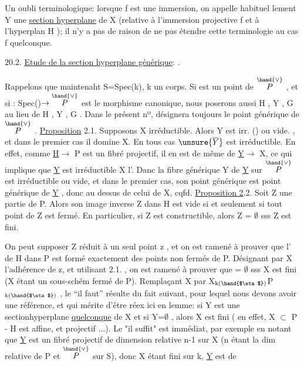 
\placedmargin{$|$}Un oubli terminologique: lorsque f est une immersion, on appelle habituel%
lement Y\hand{$_\zeta$} une \uline{section hyperplane} de X (relative à l'immersion projective
f et à l'hyperplan H  ); il n'y a pas de raison de ne pas étendre cette
terminologie au cas f quelconque.

20.2. \uline{Etude de la section hyperplane générique}:  .

Rappelons que maintenaht S=Spec(k), k un corps. Si \hand{$\eta$} est un point
de $\overset{\hand{\vee}}{P}$ ,  et si \hand{$\zeta$}: Spec(\hand{$\eta$})$\to\overset{\hand{\vee}}{P}$ est le morphisme canonique, nous poserons
aussi H\hand{$_\eta$} , Y\hand{$_\eta$} , G\hand{$_\eta$} au lieu de H\hand{$_\zeta$} , Y\hand{$_\zeta$} , G\hand{$_\zeta$} . Dans le présent nº, \hand{$\eta$}
désignera toujours le point générique de $\overset{\hand{\vee}}{P}$ .
\uline{Proposition} 2.1. Supposons X irréductible. Alors Y\hand{$_\eta$} est irr. () ou vide. ,
et dans le premier cas il domine X. En tous cas $\unsure{\overline{Y}}$ est \unsure{$_\eta$} irréductible.
En effet, comme \uline{H}$\longrightarrow$ P est un fibré projectif, il en est de même de
\uline{Y}$\longrightarrow$ X, ce qui implique que \uline{Y} est irréductible X l'. Danc la fibre
générique Y   de \uline{Y} sur $\overset{\hand{\vee}}{P}$ est irréductible ou vide, et dans le premier cas,
son point générique est point générique de \uline{Y} , donc au dessus de celui de
X, cqfd.
\uline{Proposition 2}.2. Soit Z une partie de P. Alors son image inverse Z\hand{$_\eta$} dans
H\hand{$_\eta$} est vide si et seulement si tout point de Z est fermé. En particulier,
si Z est constructible, alors Z\hand{$_\eta$} = $\emptyset$ sss Z est fini.

On peut supposer Z réduit à un seul point z , et on est ramené à
prouver que l' de H dans P est formé exactement des points non fermés de P.
Désignant par X l'adhérence de z, et utilisant 2.1. , on est ramené à
prouver que \hand{$_\eta$} = $\emptyset$ sss X est  fini (X étant un sous-schém%
fermé  de P). Remplaçant X par X$_{\text{k(\hand{$\eta$})}}$\hand{$\hookrightarrow$}P$_{\text{k(\hand{$\eta$})}}$ ,  le ``il faut'' résulte du fait
\placedmargin{$|$}suivant, pour lequel nous devons avoir une référence, et qui mérite d'être
réex ici en lemme: si Y est une sectionhyperplane \uline{quelconque} de
X et si Y\hand{\unsure{$_\eta$}}=$\emptyset$ , alors X est fini ( en effet, X $\subset$ P - H est affine, et
projectif ...). Le "il suffit" est immédiat, par exemple en notant que
\uline{Y} est un fibré projectif de dimension relative n-1 sur X (n étant la
dim relative de P  et $\overset{\hand{\vee}}{P}$ sur S), donc X étant fini sur k, \uline{Y} est de

